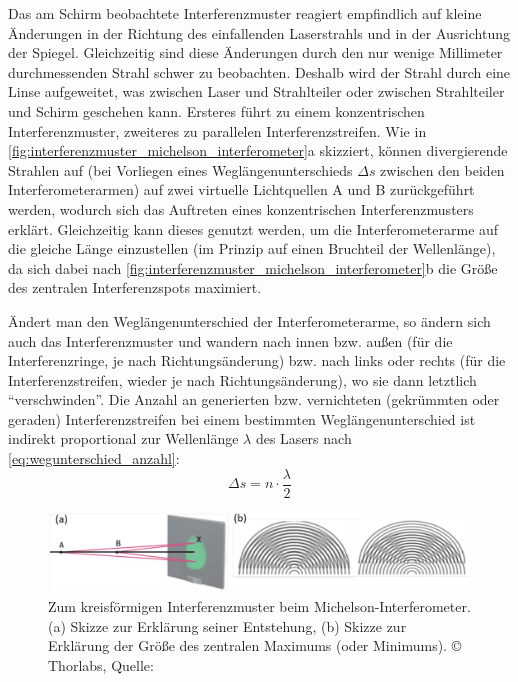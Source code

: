 \documentclass[ngerman]{scrartcl}
\begin{document}
Das am Schirm beobachtete Interferenzmuster reagiert empfindlich auf kleine Änderungen in der Richtung des einfallenden Laserstrahls und in der Ausrichtung der Spiegel. Gleichzeitig sind diese Änderungen durch den nur wenige Millimeter durchmessenden Strahl schwer zu beobachten. Deshalb wird der Strahl durch eine Linse aufgeweitet, was zwischen Laser und Strahlteiler oder zwischen Strahlteiler und Schirm geschehen kann. Ersteres führt zu einem konzentrischen Interferenzmuster, zweiteres zu parallelen Interferenzstreifen. Wie in \autoref{fig:interferenzmuster_michelson_interferometer}a skizziert, können divergierende Strahlen auf (bei Vorliegen eines Weglängenunterschieds $\Delta s$ zwischen den beiden Interferometerarmen) auf zwei virtuelle Lichtquellen A und B zurückgeführt werden, wodurch sich das Auftreten eines konzentrischen Interferenzmusters erklärt. Gleichzeitig kann dieses genutzt werden, um die Interferometerarme auf die gleiche Länge einzustellen (im Prinzip auf einen Bruchteil der Wellenlänge), da sich dabei nach \autoref{fig:interferenzmuster_michelson_interferometer}b die Größe des zentralen Interferenzspots maximiert.

Ändert man den Weglängenunterschied der Interferometerarme, so ändern sich auch das Interferenzmuster und wandern nach innen bzw. außen (für die Interferenzringe, je nach Richtungsänderung) bzw. nach links oder rechts (für die Interferenzstreifen, wieder je nach Richtungsänderung), wo sie dann letztlich \enquote{verschwinden}. Die Anzahl an generierten bzw. vernichteten (gekrümmten oder geraden) Interferenzstreifen bei einem bestimmten Weglängenunterschied ist indirekt proportional zur Wellenlänge $\lambda$ des Lasers nach \autoref{eq:wegunterschied_anzahl}:
\begin{equation}
    \label{eq:wegunterschied_anzahl}
    \Delta s = n \cdot \frac{\lambda}{2}
\end{equation}
%
\begin{figure}[H]
    \centering
    \begin{samepage}
        \includegraphics[width=\linewidth]{fig/Compressed/Angabe_Abb9.png}
        \caption[Interferenzmuster Michelson-Interferometer]{Zum kreisförmigen Interferenzmuster beim Michelson-Interferometer. (a) Skizze zur Erklärung seiner Entstehung, (b) Skizze zur Erklärung der Größe des zentralen Maximums (oder Minimums). \copyright{} Thorlabs, Quelle: \cite{ref:angabe}}
        \label{fig:interferenzmuster_michelson_interferometer}
    \end{samepage}
\end{figure}
\end{document}
